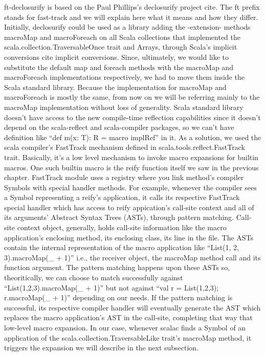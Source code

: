 ft-declosurify is based on the  Paul Phillips's declosurify project {cite}. The
ft prefix stands for fast-track and we will explain here what it
means and how they differ. Initially, declosurify could be used as a library
adding the -extension- methods macroMap and macroForeach on all Scala
collections that implemented the scala.collection.TraversableOnce trait and
Arrays, through Scala's implicit conversions {cite implicit conversions}. Since,
ultimately, we would like to substitute the default map and foreach methods
with the macroMap and macroForeach implementations respectively, we had to move
them inside the Scala standard library. Because the implementation for macroMap
and macroForeach is mostly the same, from now on we will be referring mainly to
the macroMap implementation without loss of generality. Scala standard library
doesn't have access to the new compile-time reflection capabilities since it
doesn't depend on the
scala-reflect and scala-compiler packages, so we can't have definition like
``def m(x: T): R = macro implRef'' in it. As a solution, we
used the scala
compiler's FastTrack mechanism defined in scala.tools.reflect.FastTrack
trait. Basically, it's a low level mechanism to invoke macro expansions for
builtin macros. One such builtin macro is the reify function itself  we saw in
the previous chapter. FastTrack module uses a registry where you link
method's compiler Symbols with special handler methods. For example, whenever
the compiler sees a Symbol representing a reify's application, it calls its
respective FastTrack special handler which has access to reify appication's
call-site context and all of  its arguments' Abstract Syntax Trees (ASTs),
through pattern matching. Call-site context object, generally, holds call-site
information like the macro application's enclosing method, its enclosing class,
its line in the file. The ASTs contain the internal representation of the macro
application like ``List(1, 2, 3).macroMap(_ + 1)'' i.e., the receiver object,
the macroMap method call and its function argument. The pattern
matching happens upon these ASTs so, theoritically, we can choose to match
successfully against ``List(1,2,3).macroMap(_ + 1)'' but not against ``val r =
List(1,2,3); r.macroMap(_ + 1)'' depending on our needs. If the pattern matching
is successful, its respective compiler handler will eventually generate the AST
which replaces the macro application's AST in the call-site, completing that way
that low-level macro expansion. In our case, whenever scalac finds a Symbol of
an application of the scala.collection.TraversableLike trait's macroMap
method, it triggers the expansion we will describe in the next
subsection.

